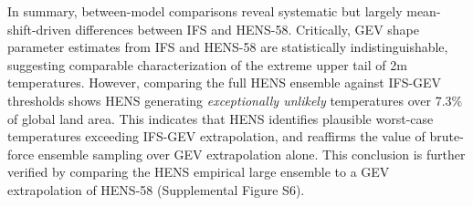 \documentclass[draft]{agujournal2019}
\begin{document}

In summary, between-model comparisons reveal systematic but largely mean-shift-driven differences between IFS and HENS-58. 
Critically, GEV shape parameter estimates from IFS and HENS-58 are statistically indistinguishable, suggesting comparable characterization of the extreme upper tail of 2m temperatures. However, comparing the full HENS ensemble against IFS-GEV thresholds shows HENS generating \textit{exceptionally unlikely} temperatures over 7.3\% of global land area.
This indicates that HENS identifies plausible worst-case temperatures exceeding IFS-GEV extrapolation, and reaffirms the value of brute-force ensemble sampling over GEV extrapolation alone. This conclusion is further verified by comparing the HENS empirical large ensemble to a GEV extrapolation of HENS-58 (Supplemental Figure S6). %
\end{document}
